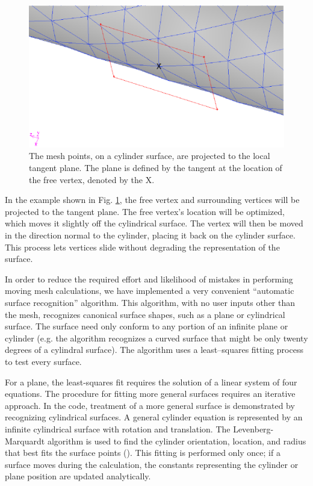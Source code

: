 \documentclass[a4paper,12pt,notitlepage]{article}
\begin{document}
\begin{figure}
  \centering
  \includegraphics[height=.4\textwidth]{Images/curved_surface.eps}
  \caption{The mesh points, on a cylinder surface, are projected to
    the local tangent plane.  The plane is defined by the tangent at the location of the free vertex, denoted by the X.}
  \label{fig:curved_surface}
\end{figure}

In the example shown in Fig. \ref{fig:curved_surface}, the free vertex and surrounding vertices will be projected to the tangent plane.  The free vertex's location will be optimized, which moves it slightly off the cylindrical surface.  The vertex will then be moved in the direction normal to the cylinder, placing it back on the cylinder surface.  This process lets vertices slide without degrading the representation of the surface.

In order to reduce the required effort and likelihood of mistakes in
performing moving mesh calculations, we have implemented a very
convenient ``automatic surface recognition'' algorithm.  This
algorithm, with no user inputs other than the mesh, recognizes
canonical surface shapes, such as a plane or cylindrical surface. The
surface need only conform to any portion of an infinite plane or
cylinder (e.g. the algorithm recognizes a curved surface that might be
only twenty degrees of a cylindral surface).  The algorithm uses a
least--squares fitting process to test every surface.  

For a plane, the least-squares fit requires the solution of a linear system of four equations.  The procedure for fitting more general surfaces requires an iterative approach.  In the code, treatment of a more general surface is demonstrated by recognizing cylindrical surfaces.  A general cylinder equation is represented by an infinite cylindrical surface with rotation and translation.  The Levenberg-Marquardt algorithm is used to find the cylinder orientation, location, and radius that best fits the surface points (\cite{SLATEC:Vandervender}).  This fitting is performed only once; if a surface moves during the calculation, the constants representing the cylinder or plane position are updated analytically.  
\end{document}
